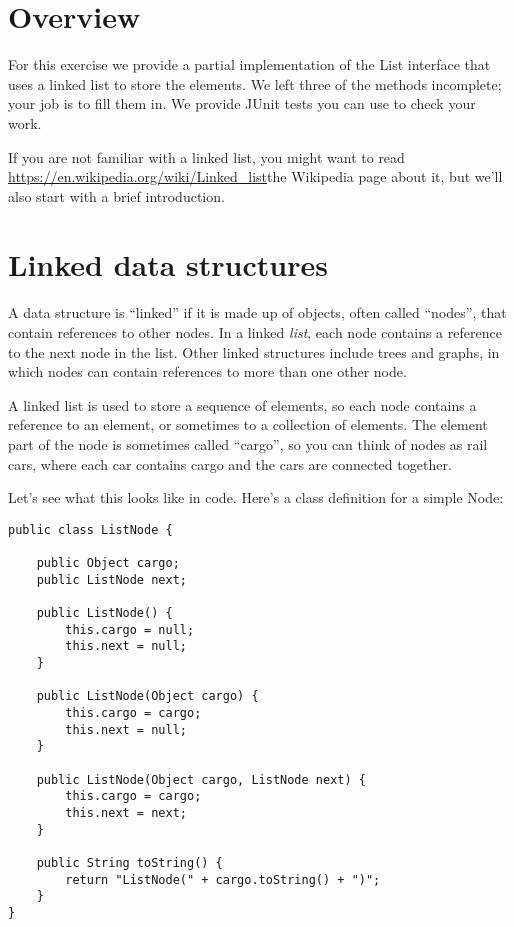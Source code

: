 \documentclass[12pt]{book}
\theoremstyle{exercise}
\begin{document}
{\section{Overview}\label{overview-3}

For this exercise we provide a partial implementation of the List interface
that uses a linked list to store the elements. We left three of the
methods incomplete; your job is to fill them in. We provide JUnit tests
you can use to check your work.

If you are not familiar with a linked list, you might want to read
\url{https://en.wikipedia.org/wiki/Linked_list}{the Wikipedia page
about it}, but we'll also start with a brief introduction.

\section{Linked data structures}\label{linked-data-structures}

A data structure is ``linked'' if it is made up of objects, often called
``nodes'', that contain references to other nodes. In a linked
\emph{list}, each node contains a reference to the next node in the
list. Other linked structures include trees and graphs, in which nodes
can contain references to more than one other node.

A linked list is used to store a sequence of elements, so each node
contains a reference to an element, or sometimes to a collection of
elements. The element part of the node is sometimes called ``cargo'', so
you can think of nodes as rail cars, where each car contains cargo and
the cars are connected together.

Let's see what this looks like in code. Here's a class definition for a
simple Node:

\begin{verbatim}
public class ListNode {

    public Object cargo;
    public ListNode next;

    public ListNode() {
        this.cargo = null;
        this.next = null;
    }

    public ListNode(Object cargo) {
        this.cargo = cargo;
        this.next = null;
    }

    public ListNode(Object cargo, ListNode next) {
        this.cargo = cargo;
        this.next = next;
    }

    public String toString() {
        return "ListNode(" + cargo.toString() + ")";
    }
}
\end{verbatim}

}
\end{document}
